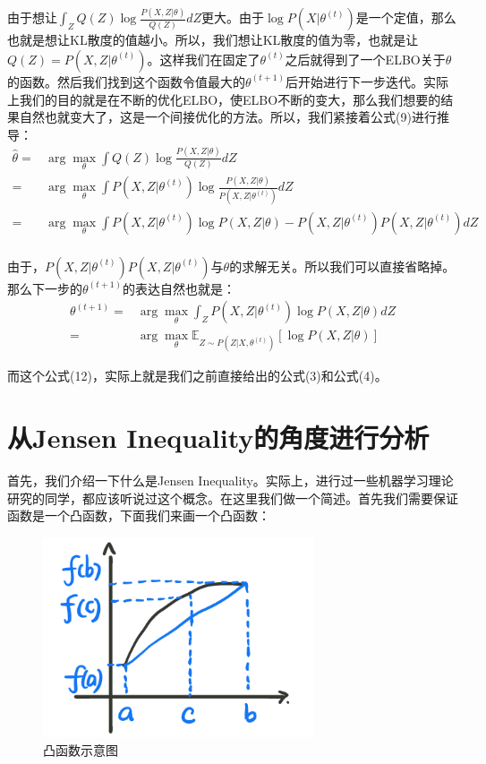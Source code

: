 \documentclass[a4paper]{article}
\begin{document}
由于想让$\int_Z Q(Z) \log \frac{P(X,Z|\theta)}{Q(Z)}dZ$更大。由于$\log P(X|\theta^{(t)})$是一个定值，那么也就是想让KL散度的值越小。所以，我们想让KL散度的值为零，也就是让$Q(Z) = P(X,Z|\theta^{(t)})$。这样我们在固定了$\theta^{(t)}$之后就得到了一个ELBO关于$\theta$的函数。然后我们找到这个函数令值最大的$\theta^{(t+1)}$后开始进行下一步迭代。实际上我们的目的就是在不断的优化ELBO，使ELBO不断的变大，那么我们想要的结果自然也就变大了，这是一个间接优化的方法。所以，我们紧接着公式(9)进行推导：
\begin{equation}
    \begin{split}
        \hat{\theta} 
        = & \arg\max_{\theta} \int Q(Z)\log \frac{P(X,Z|\theta)}{Q(Z)}dZ \\ 
        = & \arg\max_{\theta} \int P(X,Z|\theta^{(t)})\log \frac{P(X,Z|\theta)}{P(X,Z|\theta^{(t)})}dZ \\
        = & \arg\max_{\theta} \int P(X,Z|\theta^{(t)})\log P(X,Z|\theta) - P(X,Z|\theta^{(t)})P(X,Z|\theta^{(t)})dZ \\
    \end{split}
\end{equation}

由于，$P(X,Z|\theta^{(t)})P(X,Z|\theta^{(t)})$与$\theta$的求解无关。所以我们可以直接省略掉。那么下一步的$\theta^{(t+1)}$的表达自然也就是：
\begin{equation}
    \begin{split}
        \theta^{(t+1)} 
        = & \arg\max_{\theta} \int_Z P(X,Z|\theta^{(t)})\log P(X,Z|\theta)dZ \\
        = & \arg\max_{\theta} \mathbb{E}_{Z\sim P(Z|X,\theta^{(t)})}\left[ \log P(X,Z|\theta) \right]
    \end{split}
\end{equation}

而这个公式(12)，实际上就是我们之前直接给出的公式(3)和公式(4)。

\section{从Jensen Inequality的角度进行分析}
首先，我们介绍一下什么是Jensen Inequality。实际上，进行过一些机器学习理论研究的同学，都应该听说过这个概念。在这里我们做一个简述。首先我们需要保证函数是一个凸函数，下面我们来画一个凸函数：
\begin{figure}[H]
    \centering
    \includegraphics[width=.40\textwidth]{微信图片_20191218214143.png}
    \caption{凸函数示意图}
    \label{fig:my_label_1}
\end{figure}
\end{document}
